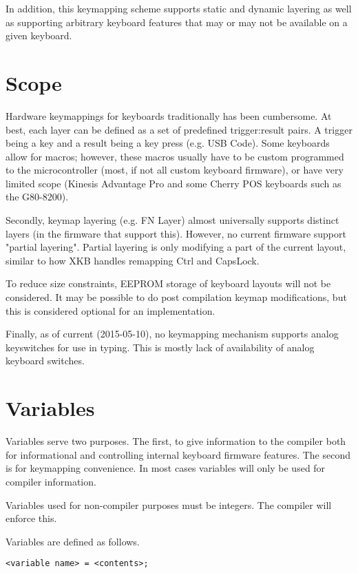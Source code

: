 \documentclass{kiibohd-template}
\begin{document}
In addition, this keymapping scheme supports static and dynamic layering as well as supporting arbitrary keyboard features that may or may not be available on a given keyboard.


\chapter{Scope}

Hardware keymappings for keyboards traditionally has been cumbersome.
At best, each layer can be defined as a set of predefined trigger:result pairs.
A trigger being a key and a result being a key press (e.g. USB Code).
Some keyboards allow for macros; however, these macros usually have to be custom programmed to the microcontroller (most, if not all custom keyboard firmware), or have very limited scope (Kinesis Advantage Pro and some Cherry POS keyboards such as the G80-8200).

Secondly, keymap layering (e.g. FN Layer) almost universally supports distinct layers (in the firmware that support this).
However, no current firmware support "partial layering".
Partial layering is only modifying a part of the current layout, similar to how XKB handles remapping Ctrl and CapsLock.

To reduce size constraints, EEPROM storage of keyboard layouts will not be considered.
It may be possible to do post compilation keymap modifications, but this is considered optional for an implementation.

Finally, as of current (2015-05-10), no keymapping mechanism supports analog keyswitches for use in typing.
This is mostly lack of availability of analog keyboard switches.


\chapter{Variables}

Variables serve two purposes.
The first, to give information to the compiler both for informational and controlling internal keyboard firmware features.
The second is for keymapping convenience.
In most cases variables will only be used for compiler information.

Variables used for non-compiler purposes must be integers.
The compiler will enforce this.

Variables are defined as follows.

\begin{lstlisting}
<variable name> = <contents>;
\end{lstlisting}
\end{document}
